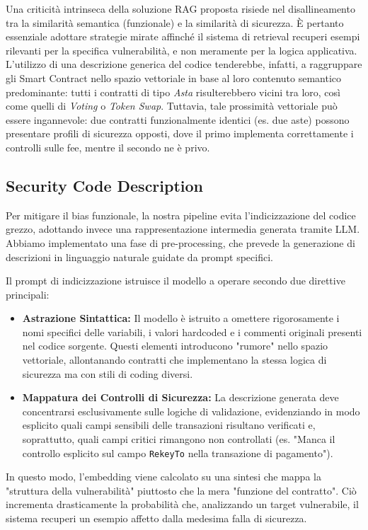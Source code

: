 Una criticità intrinseca della soluzione RAG proposta risiede nel disallineamento tra la similarità semantica (funzionale) e la similarità di sicurezza. È pertanto essenziale adottare strategie mirate affinché il sistema di retrieval recuperi esempi rilevanti per la specifica vulnerabilità, e non meramente per la logica applicativa.
L'utilizzo di una descrizione generica del codice tenderebbe, infatti, a raggruppare gli Smart Contract nello spazio vettoriale in base al loro contenuto semantico predominante: tutti i contratti di tipo \textit{Asta} risulterebbero vicini tra loro, così come quelli di \textit{Voting} o \textit{Token Swap}.
Tuttavia, tale prossimità vettoriale può essere ingannevole: due contratti funzionalmente identici (es. due aste) possono presentare profili di sicurezza opposti, dove il primo implementa correttamente i controlli sulle fee, mentre il secondo ne è privo.

\subsection{Security Code Description}
\label{sec:sec_code_desc}
Per mitigare il bias funzionale, la nostra pipeline evita l'indicizzazione del codice grezzo, adottando invece una rappresentazione intermedia generata tramite LLM.
Abbiamo implementato una fase di pre-processing, che prevede la generazione di descrizioni in linguaggio naturale guidate da prompt specifici.

Il prompt di indicizzazione istruisce il modello a operare secondo due direttive principali:
\begin{itemize}
    \item \textbf{Astrazione Sintattica:} Il modello è istruito a omettere rigorosamente i nomi specifici delle variabili, i valori hardcoded e i commenti originali presenti nel codice sorgente. Questi elementi introducono "rumore" nello spazio vettoriale, allontanando contratti che implementano la stessa logica di sicurezza ma con stili di coding diversi.
    \item \textbf{Mappatura dei Controlli di Sicurezza:} La descrizione generata deve concentrarsi esclusivamente sulle logiche di validazione, evidenziando in modo esplicito quali campi sensibili delle transazioni risultano verificati e, soprattutto, quali campi critici rimangono non controllati (es. "Manca il controllo esplicito sul campo \texttt{RekeyTo} nella transazione di pagamento").
\end{itemize}

In questo modo, l'embedding viene calcolato su una sintesi che mappa la "struttura della vulnerabilità" piuttosto che la mera "funzione del contratto". Ciò incrementa drasticamente la probabilità che, analizzando un target vulnerabile, il sistema recuperi un esempio affetto dalla medesima falla di sicurezza.

